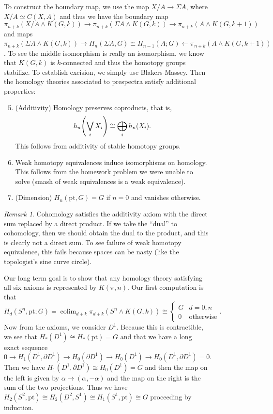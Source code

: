 \documentclass[leqno, openany]{memoir}
\theoremstyle{definition}
\theoremstyle{remark}
\newtheorem{rmk}[thm]{Remark}
\theoremstyle{plain}
\theoremstyle{definition}
\theoremstyle{remark}
\newcommand{\mr}[1]{\mathrm{#1}}
\DeclareMathOperator{\colim}{colim}
\begin{document}
\begin{figure}[H]
To construct the boundary map, we use the map $X/A \to \Sigma A$, where $X/A
\simeq C(X,A)$ and thus we have the boundary map
\[ \pi_{n+k}(X/A \wedge K(G, k)) \to \pi_{n+k}(\Sigma A \wedge K(G, k)) \to
\pi_{n+k}(A \wedge K(G, k+1)) \] and maps $\pi_{n+k}(\Sigma A \wedge K(G, k))
\to H_n(\Sigma A, G) \cong H_{n-1}(A;G) \gets \pi_{n+k}(A \wedge K(G, k+1))$.
To see the middle isomorphism is really an isomorphism, we know that $K(G, k)$
is $k$-connected and thus the homotopy groups stabilize. To establish excision,
we simply use Blakers-Massey. Then the homology theories associated to
prespectra satisfy additional properties: \begin{enumerate}
    \setcounter{enumi}{4} \item (Additivity) Homology preserves coproducts,
    that is, \[ h_n\qty(\bigvee_i X_i) \cong \bigoplus_i h_n(X_i). \] This
    follows from additivity of stable homotopy groups.  \item Weak homotopy
    equivalences induce isomorphisms on homology. This follows from the
    homework problem we were unable to solve (smash of weak equivalences is a
    weak equivalence).  \item (Dimension) $H_n(\mr{pt}, G) = G$ if $n=0$ and
    vanishes otherwise.  \end{enumerate}

\begin{rmk} Cohomology satisfies the additivity axiom with the direct sum
    replaced by a direct product. If we take the ``dual'' to cohomology, then
    we should obtain the dual to the product, and this is clearly not a direct
    sum. To see failure of weak homotopy equivalence, this fails because spaces
    can be nasty (like the topologist's sine curve circle).  \end{rmk}

Our long term goal is to show that any homology theory satisfying all six
axioms is represented by $K(\pi, n)$. Our first computation is that \[ H_d(S^n,
    \mr{pt}; G) = \colim_{d+k} \pi_{d+k}(S^n \wedge K(G, k)) \cong
    \begin{cases} G & d = 0,n \\ 0 & \text{otherwise} \end{cases}. \] Now from
    the axioms, we consider $D^1$. Because this is contractible, we see that
    $H_*(D^1) \cong H_*(\mr{pt}) = G$ and that we have a long exact sequence \[
    0 \to H_1(D^1, \partial D^1) \to H_0(\partial D^1) \to H_0(D^1) \to
H_0(D^1, \partial D^1) = 0. \] Then we have $H_1(D^1, \partial D^1) \cong
H_0(D^1) = G$ and then the map on the left is given by $\alpha \mapsto (\alpha,
-\alpha)$ and the map on the right is the sum of the two projections. Thus we
have $H_2(S^2, \mr{pt}) \cong H_2(D^2, S^1) \cong H_1(S^1, \mr{pt}) \cong G$
proceeding by induction. 


\end{figure}
\end{document}
